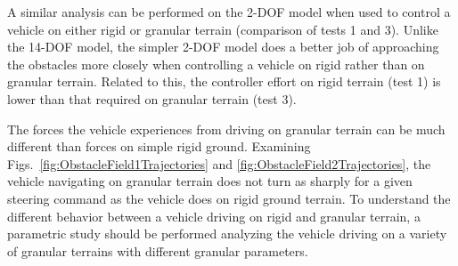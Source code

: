 \documentclass[12pt,twocolumn]{article}
\begin{document}
%

A similar analysis can be performed on the 2-DOF model when used to control a vehicle on either rigid or granular terrain (comparison of tests 1 and 3). Unlike the 14-DOF model, the simpler 2-DOF model does a better job of approaching the obstacles more closely when controlling a vehicle on rigid rather than on granular terrain. Related to this, the controller effort on rigid terrain (test 1) is lower than that required on granular terrain (test 3).

The forces the vehicle experiences from driving on granular terrain can be much different than forces on simple rigid ground. Examining Figs.~\ref{fig:ObstacleField1Trajectories} and \ref{fig:ObstacleField2Trajectories}, the vehicle navigating on granular terrain does not turn as sharply for a given steering command as the vehicle does on rigid ground terrain. To understand the different behavior between a vehicle driving on rigid and granular terrain, a parametric study should be performed analyzing the vehicle driving on a variety of granular terrains with different granular parameters. 
\end{document}
